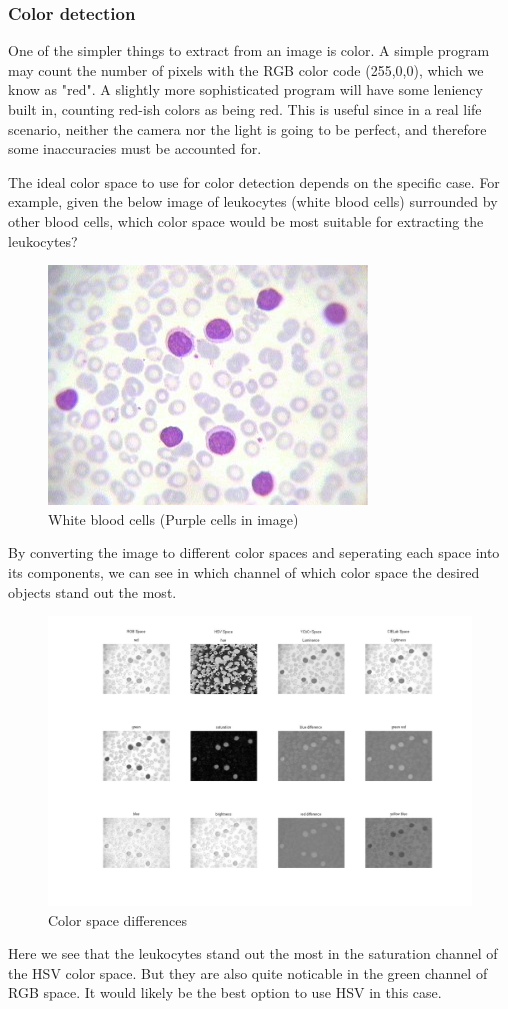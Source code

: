 			\subsubsection{Color detection}
			
			One of the simpler things to extract from an image is color. A simple program may count the number of pixels with the RGB color code (255,0,0), which we know as "red". A slightly more sophisticated program will have some leniency built in, counting red-ish colors as being red. This is useful since in a real life scenario, neither the camera nor the light is going to be perfect, and therefore some inaccuracies must be accounted for. 
			
			The ideal color space to use for color detection depends on the specific case. 
			For example, given the below image of leukocytes (white blood cells) surrounded by other blood cells, which color space would be most suitable for extracting the leukocytes?
			\begin{figure}[H]
				\centering
				\includegraphics[width=0.2\linewidth]{figure/Analysis/leukocytes.jpg}
				\caption{White blood cells (Purple cells in image)}
				\label{fig:leukocytes}
			\end{figure}
			
			By converting the image to different color spaces and seperating each space into its components, we can see in which channel of which color space the desired objects stand out the most. 
			
					\begin{figure}[H]
				\centering
				\includegraphics[width=\linewidth]{figure/Analysis/differences.jpg}
				\caption{Color space differences}
				\label{fig:differences}
			\end{figure}
		Here we see that the leukocytes stand out the most in the saturation channel of the HSV color space. But they are also quite noticable in the green channel of RGB space. It would likely be the best option to use HSV in this case. 
		
